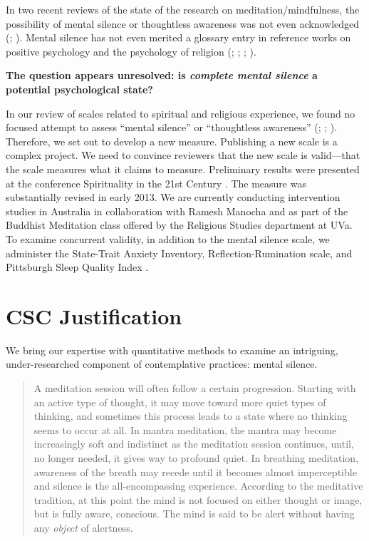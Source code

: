 \documentclass[12pt]{article}
\begin{document}
In two recent reviews of the state of the research on meditation/mindfulness,
the possibility of mental silence or thoughtless awareness was not
even acknowledged (; ).
Mental silence has not even merited a glossary entry in reference works on
positive psychology and the psychology of religion
(; ;
; ).

\textbf{The question appears unresolved: is \emph{complete mental silence} a
potential psychological state?}

In our review of scales related to spiritual and religious experience,
we found no focused attempt to assess
``mental silence'' or ``thoughtless awareness'' (;
; ).
Therefore, we set out to develop a new measure.
Publishing a new scale is a complex project.
We need to convince
reviewers that the new scale is valid---that the scale measures what
it claims to measure.
Preliminary results were presented at the conference Spirituality in the
21st Century  \cite{pritikin2013}.
The measure was substantially revised in early 2013.
We are currently conducting intervention studies in Australia in
collaboration with Ramesh Manocha and as part of the Buddhist
Meditation class offered by the Religious Studies department at UVa.
To examine concurrent validity, in addition to the mental silence scale,
we administer the State-Trait Anxiety
Inventory, Reflection-Rumination scale, and Pittsburgh Sleep Quality
Index \cite{buysse1989,spielberger1983,trapnell1999}.

\section{CSC Justification}

We bring our expertise with quantitative methods to examine
an intriguing, under-researched component of contemplative practices:
mental silence.

\begin{quotation}
\noindent A meditation session will often follow a certain progression. Starting
with an active type of thought, it may move toward more quiet types of
thinking, and sometimes this process leads to a state where no
thinking seems to occur at all. In mantra meditation, the mantra may
become increasingly soft and indistinct as the meditation session
continues, until, no longer needed, it gives way to profound quiet. In
breathing meditation, awareness of the breath may recede until it
becomes almost imperceptible and silence is the all-encompassing
experience.  According to the meditative tradition, at this point the
mind is not focused on either thought or image, but is fully aware,
conscious. The mind is said to be alert without having any
\emph{object} of alertness.
\cite[p.~91]{carrington1977}
\end{quotation}
\end{document}
